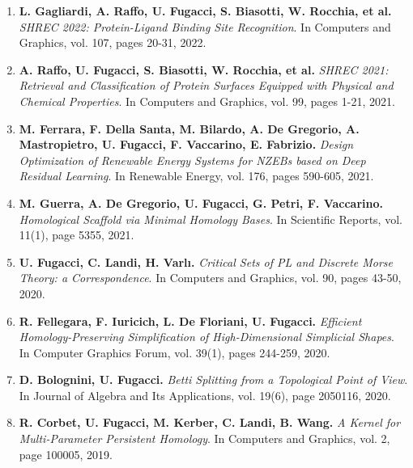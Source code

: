 \documentclass[11pt]{article}
\begin{document}
\begin{enumerate}

\item{\bf L. Gagliardi, A. Raffo, U. Fugacci, S. Biasotti, W. Rocchia,
et al.
} {\em SHREC 2022: Protein-Ligand Binding Site Recognition}. In Computers and Graphics, vol. 107, pages 20-31, 2022.

\item {\bf A. Raffo, U. Fugacci, S. Biasotti, W. Rocchia,
et al.
} {\em SHREC 2021: Retrieval and Classification of Protein Surfaces Equipped with Physical and Chemical Properties}. In Computers and Graphics, vol. 99, pages 1-21, 2021.

\item {\bf M. Ferrara, F. Della Santa, M. Bilardo, A. De Gregorio, A. Mastropietro, U. Fugacci, F. Vaccarino, E. Fabrizio.} {\em Design Optimization of Renewable Energy Systems for NZEBs based on Deep Residual Learning}. In Renewable Energy, vol. 176, pages 590-605, 2021.

\item {\bf M. Guerra, A. De Gregorio, U. Fugacci, G. Petri, F. Vaccarino.} {\em Homological Scaffold via Minimal Homology Bases}. In Scientific Reports, vol. 11(1), page 5355, 2021.

\item {\bf U. Fugacci, C. Landi, H. Varl{\i}.} {\em Critical Sets of PL and Discrete Morse Theory: a Correspondence}. In Computers and Graphics, vol. 90, pages 43-50, 2020.

\item {\bf R. Fellegara, F. Iuricich, L. De Floriani, U. Fugacci.} {\em Efficient Homology-Preserving Simplification of High-Dimensional Simplicial Shapes}. In Computer Graphics Forum, vol. 39(1), pages 244-259, 2020.

\item {\bf D. Bolognini, U. Fugacci.} {\em Betti Splitting from a Topological Point of View}. In Journal of Algebra and Its Applications, vol. 19(6), page 2050116, 2020.

\item {\bf R. Corbet, U. Fugacci, M. Kerber, C. Landi, B. Wang.} {\em A Kernel for Multi-Parameter Persistent Homology}. In Computers and Graphics, vol. 2, page 100005, 2019.


\end{enumerate}
\end{document}
